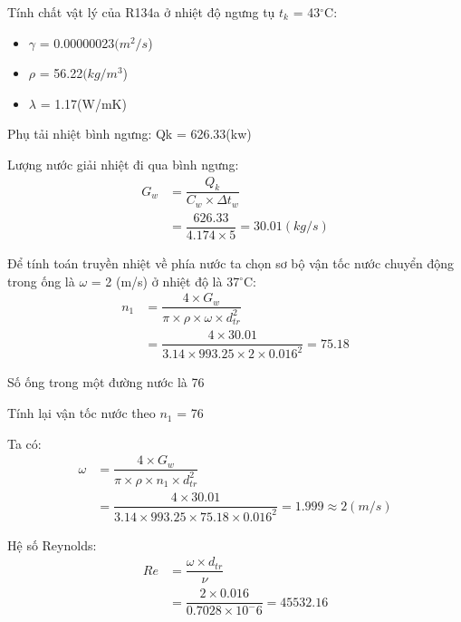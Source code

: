 Tính chất vật lý của R134a ở nhiệt độ ngưng tụ $ t_{k} $ = 43$^{\circ}$C:
\begin{itemize}
	\item $\gamma$ = 0.00000023$(m^2/s$)
	\item $\rho$ = 56.22$(kg/m^3$)
	\item $\lambda$ = 1.17(W/mK)
\end{itemize}

Phụ tải nhiệt bình ngưng: Q{\scriptsize k} = 626.33(kw)

Lượng nước giải nhiệt đi qua bình ngưng:
\begin{equation*}
	\begin{split}
		G_{w} &= \dfrac{Q_{k}}{C_{w}\times \Delta t_{w}}\\
		&=\dfrac{626.33}{4.174 \times 5} = 30.01(kg/s)
	\end{split}
\end{equation*}

Để tính toán truyền nhiệt về phía nước ta chọn sơ bộ vận tốc nước chuyển động trong ống là $\omega$ = 2 (m/s) ở nhiệt độ là 37$^{\circ}$C:
\begin{equation*}
	\begin{split}
		n_{1} &= \dfrac{4\times G_{w}}{\pi\times\rho\times\omega\times d_{tr}^2}\\
		&= \dfrac{4 \times 30.01}{3.14 \times 993.25 \times 2 \times 0.016^2}= 75.18
	\end{split}
\end{equation*}

Số ống trong một đường nước là 76

Tính lại vận tốc nước theo $n_{1}$ = 76

Ta có:
\begin{equation*}
	\begin{split}
		\omega &= \dfrac{4\times G_{w}}{\pi\times\rho\times n_{1}\times d_{tr}^2}\\
		&= \dfrac{4 \times 30.01}{3.14 \times 993.25 \times 75.18 \times 0.016^2} = 1.999  \approx 2 (m/s)
	\end{split}
\end{equation*}

Hệ số Reynolds:
\begin{equation*}
	\begin{split}
		Re &= \dfrac{\omega\times d_{tr}}{\nu}\\
		&= \dfrac{2 \times 0.016}{0.7028 \times 10^-6} = 45532.16
	\end{split}
\end{equation*}

